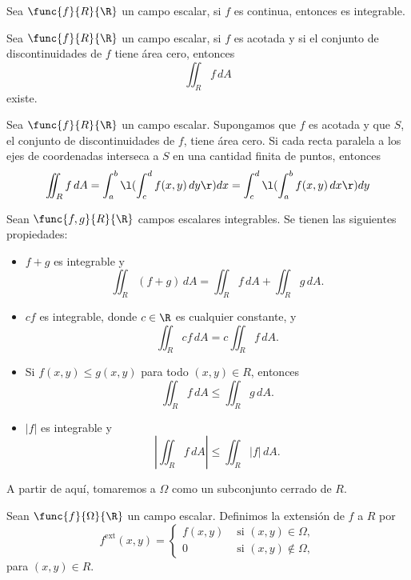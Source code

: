 \documentclass[a4,11pt]{aleph-notas}
\begin{document}
\begin{prop}
    Sea $\func{f}{R}{\R}$ un campo escalar, si $f$ es continua, entonces es integrable.
\end{prop}

\begin{prop}
    Sea $\func{f}{R}{\R}$ un campo escalar, si $f$ es acotada y si el conjunto de discontinuidades de $f$ tiene área cero, entonces
    \[
        \iint_R f\, dA
    \]
    existe.
\end{prop}

\begin{teo}
    Sea $\func{f}{R}{\R}$ un campo escalar. Supongamos que $f$ es acotada y que $S$, el conjunto de discontinuidades de $f$, tiene área cero. Si cada recta paralela a los ejes de coordenadas interseca a $S$ en una cantidad finita de puntos, entonces
    \[
        \iint_R f\, dA = \int_a^b\l( \int_c^d f(x,y)\, dy\r)dx = \int_c^d\l( \int_a^b f(x,y)\, dx\r)dy
    \]
\end{teo}

\begin{prop}
    Sean $\func{f,g}{R}{\R}$ campos escalares integrables. Se tienen las siguientes propiedades:
    \begin{itemize}
        \item $f+g$ es integrable y
        \[
            \iint_R (f+g)\, dA = \iint_R f\, dA + \iint_R g\, dA.
        \]
        \item $cf$ es integrable, donde $c\in\R$ es cualquier constante, y
        \[
            \iint_R cf\, dA = c \iint_R f\, dA.
        \]
        \item Si $f(x,y)\leq g(x,y)$ para todo $(x,y)\in R$, entonces
        \[
            \iint_R f\, dA \leq \iint_R g\, dA.
        \]
        \item $|f|$ es integrable y
        \[
            \left| \iint_R f\, dA \right| \leq \iint_R |f|\, dA.
        \]
    \end{itemize}
\end{prop}

A partir de aquí, tomaremos a $\Omega$ como un subconjunto cerrado de $R$.

\begin{defi}
    Sean $\func{f}{\Omega}{\R}$ un campo escalar. Definimos la extensión de $f$ a $R$ por
    \[
        f^{\text{ext}}(x,y) = \begin{cases}
                        f(x,y) & \text{ si } (x,y)\in \Omega, \\
                        0 & \text{ si } (x,y) \not\in \Omega,
                        \end{cases}
    \]
    para $(x,y)\in R$.
\end{defi}
\end{document}
